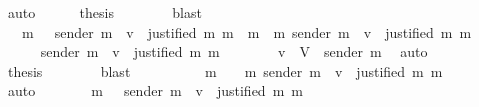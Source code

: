 \begin{isabellebody}
\ auto\isanewline
\ \ \ \ \isamarkupfalse%
\ {\isacharquery}thesis\isanewline
\ \ \ \ \ \ \isamarkupfalse%
\ blast\isanewline
\ \ \isamarkupfalse%
\isanewline
\ \ \isamarkupfalse%
\ \isamarkupfalse%
\ {\isachardoublequoteopen}{\isasymdots}\ {\isacharequal}\ {\isacharbraceleft}m{\isacharprime}{\isacharprime}\ {\isasymin}\ {\isasymsigma}{\isachardot}\ sender\ m{\isacharprime}{\isacharprime}\ {\isacharequal}\ v\ {\isasymand}\ justified\ m\ m{\isacharprime}{\isacharprime}{\isacharbraceright}\ {\isasymunion}\ {\isacharbraceleft}m{\isacharprime}{\isacharprime}\ {\isasymin}\ {\isacharbraceleft}m{\isacharprime}{\isacharbraceright}{\isachardot}\ sender\ m{\isacharprime}{\isacharprime}\ {\isacharequal}\ v\ {\isasymand}\ justified\ m\ m{\isacharprime}{\isacharprime}{\isacharbraceright}{\isachardoublequoteclose}\isanewline
\ \ \isamarkupfalse%
{\isacharminus}\isanewline
\ \ \ \ \isamarkupfalse%
\ {\isachardoublequoteopen}sender\ m{\isacharprime}\ {\isacharequal}\ v\ {\isasymLongrightarrow}\ justified\ m\ m{\isacharprime}{\isachardoublequoteclose}\isanewline
\ \ \ \ \ \ \isamarkupfalse%
\ {\isacartoucheopen}v\ {\isasymin}\ V\ {\isacharminus}\ {\isacharbraceleft}sender\ m{\isacharprime}{\isacharbraceright}{\isacartoucheclose}\ \isamarkupfalse%
\ auto\isanewline
\ \ \ \ \isamarkupfalse%
\ {\isacharquery}thesis\isanewline
\ \ \ \ \ \ \isamarkupfalse%
\ blast\isanewline
\ \ \isamarkupfalse%
\isanewline
\ \ \isamarkupfalse%
\ \isamarkupfalse%
\ {\isachardoublequoteopen}{\isasymdots}\ {\isacharequal}\ {\isacharbraceleft}m{\isacharprime}{\isacharprime}\ {\isasymin}\ {\isasymsigma}\ {\isasymunion}\ {\isacharbraceleft}m{\isacharprime}{\isacharbraceright}{\isachardot}\ sender\ m{\isacharprime}{\isacharprime}\ {\isacharequal}\ v\ {\isasymand}\ justified\ m\ m{\isacharprime}{\isacharprime}{\isacharbraceright}{\isachardoublequoteclose}\isanewline
\ \ \ \ \isamarkupfalse%
\ auto\isanewline
\ \ \isamarkupfalse%
\ \isamarkupfalse%
\ {\isachardoublequoteopen}{\isasymdots}\ {\isacharequal}\ {\isacharbraceleft}m{\isacharprime}{\isacharprime}\ {\isasymin}\ {\isasymsigma}{\isacharprime}{\isachardot}\ sender\ m{\isacharprime}{\isacharprime}\ {\isacharequal}\ v\ {\isasymand}\ justified\ m\ m{\isacharprime}{\isacharprime}{\isacharbraceright}{\isachardoublequoteclose}\isanewline
\ \ \isamarkupfalse%

\end{isabellebody}
